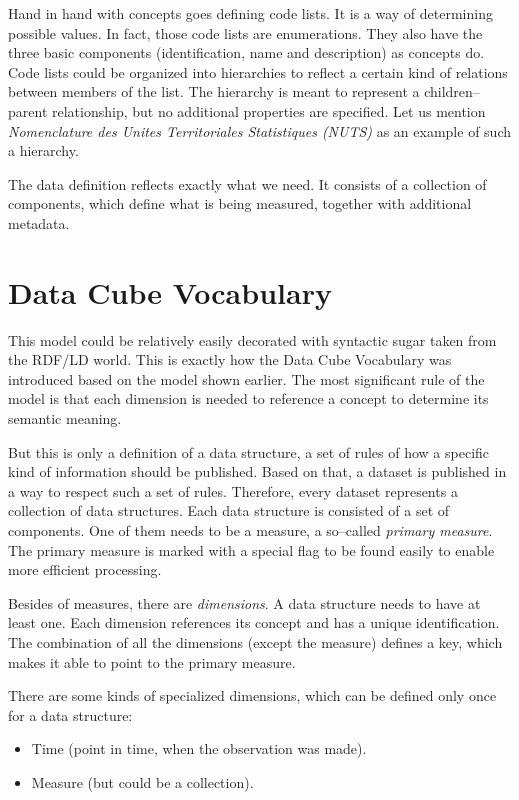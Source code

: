 \label{SDMX-code-lists}
Hand in hand with concepts goes defining code lists. It is a way of determining possible
values. In fact, those code lists are enumerations. They also have the three basic components
(identification, name and description) as concepts do. Code lists could be organized into
hierarchies to reflect a certain kind of relations between members of the list. The hierarchy
is meant to represent a children--parent relationship, but no additional properties are specified.
Let us mention \emph{Nomenclature des Unites Territoriales Statistiques (NUTS)} 
as an example of such a hierarchy.

The data definition reflects exactly what we need. It consists of a collection of 
components, which define what is being measured, together with additional metadata.

\section{Data Cube Vocabulary}
\label{datacube-vocabulary}

This model could be relatively easily decorated with syntactic sugar taken from the
RDF/LD world. This is exactly how the Data Cube Vocabulary was introduced based
on the model shown earlier. The most significant rule of the model is that each
dimension is needed to reference a concept to determine its semantic meaning.

But this is only a definition of a data structure, a set of rules of how a specific kind of information
should be published. Based on that, a dataset is published in a way to respect such a set
of rules. Therefore, every dataset represents a collection of data structures. Each data
structure is consisted of a set of components. One of them needs to be a measure,
a so--called \emph{primary measure}. The primary measure is marked with a special flag to be found
easily to enable more efficient processing.

Besides of measures, there are \emph{dimensions}. A data structure needs to have at least one.
Each dimension references its concept and has a unique identification. The combination of
all the dimensions (except the measure) defines a key, which makes it able to point
to the primary measure.

There are some kinds of specialized dimensions, which can be defined only once
for a data structure:

\begin{itemize}
\item Time (point in time, when the observation was made).
\item Measure (but could be a collection).
\end{itemize}

